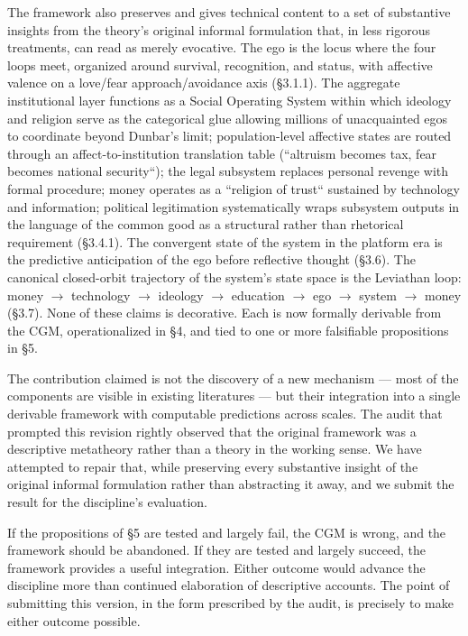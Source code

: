\documentclass[12pt,a4paper]{article}
\begin{document}
The framework also preserves and gives technical content to a set of substantive insights from the theory's original informal formulation that, in less rigorous treatments, can read as merely evocative. The ego is the locus where the four loops meet, organized around survival, recognition, and status, with affective valence on a love/fear approach/avoidance axis (§3.1.1). The aggregate institutional layer functions as a Social Operating System within which ideology and religion serve as the categorical glue allowing millions of unacquainted egos to coordinate beyond Dunbar's limit; population-level affective states are routed through an affect-to-institution translation table (``altruism becomes tax, fear becomes national security``); the legal subsystem replaces personal revenge with formal procedure; money operates as a ``religion of trust`` sustained by technology and information; political legitimation systematically wraps subsystem outputs in the language of the common good as a structural rather than rhetorical requirement (§3.4.1). The convergent state of the system in the platform era is the predictive anticipation of the ego before reflective thought (§3.6). The canonical closed-orbit trajectory of the system's state space is the Leviathan loop: money $\rightarrow$ technology $\rightarrow$ ideology $\rightarrow$ education $\rightarrow$ ego $\rightarrow$ system $\rightarrow$ money (§3.7). None of these claims is decorative. Each is now formally derivable from the CGM, operationalized in §4, and tied to one or more falsifiable propositions in §5.


The contribution claimed is not the discovery of a new mechanism --- most of the components are visible in existing literatures --- but their integration into a single derivable framework with computable predictions across scales. The audit that prompted this revision rightly observed that the original framework was a descriptive metatheory rather than a theory in the working sense. We have attempted to repair that, while preserving every substantive insight of the original informal formulation rather than abstracting it away, and we submit the result for the discipline's evaluation.


If the propositions of §5 are tested and largely fail, the CGM is wrong, and the framework should be abandoned. If they are tested and largely succeed, the framework provides a useful integration. Either outcome would advance the discipline more than continued elaboration of descriptive accounts. The point of submitting this version, in the form prescribed by the audit, is precisely to make either outcome possible.
\end{document}
